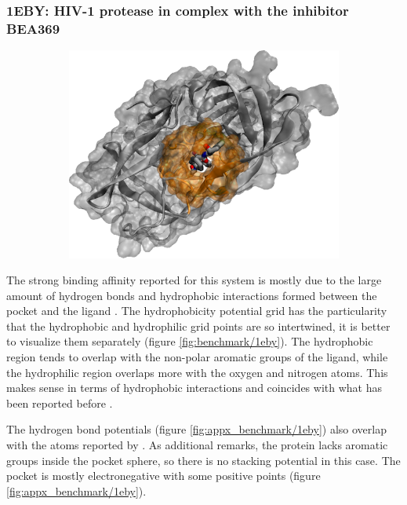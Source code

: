     \subsubsection{1EBY: HIV-1 protease in complex with the inhibitor BEA369}
      \begin{figure}[H] \centering
        \begin{subfigure}[c]{0.3\textwidth} \centering
          \includegraphics[width=1\textwidth]{figures/results/ps_prot/1eby.png}
        \end{subfigure}
        \begin{subfigure}[c]{0.3\textwidth} \centering
        \end{subfigure}
      \end{figure}

      The strong binding affinity reported for this system is mostly due to the large amount of hydrogen bonds and hydrophobic interactions formed between the pocket and the ligand \cite{benchmark_strong_2021}. The hydrophobicity potential grid has the particularity that the hydrophobic and hydrophilic grid points are so intertwined, it is better to visualize them separately (figure \ref{fig:benchmark/1eby}). The hydrophobic region tends to overlap with the non-polar aromatic groups of the ligand, while the hydrophilic region overlaps more with the oxygen and nitrogen atoms. This makes sense in terms of hydrophobic interactions and coincides with what has been reported before \cite{benchmark_strong_2021}.

      The hydrogen bond potentials (figure \ref{fig:appx_benchmark/1eby}) also overlap with the atoms reported by \cite{benchmark_strong_2021}. As additional remarks, the protein lacks aromatic groups inside the pocket sphere, so there is no stacking potential in this case. The pocket is mostly electronegative with some positive points (figure \ref{fig:appx_benchmark/1eby}).

